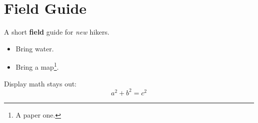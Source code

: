\documentclass{article}
\begin{document}
\section{Field Guide}
A short \textbf{field} guide for \emph{new} hikers.

\begin{itemize}
  \item Bring water.
  \item Bring a map\footnote{A paper one.}.
\end{itemize}

Display math stays out:
\[ a^2 + b^2 = c^2 \]
\end{document}
